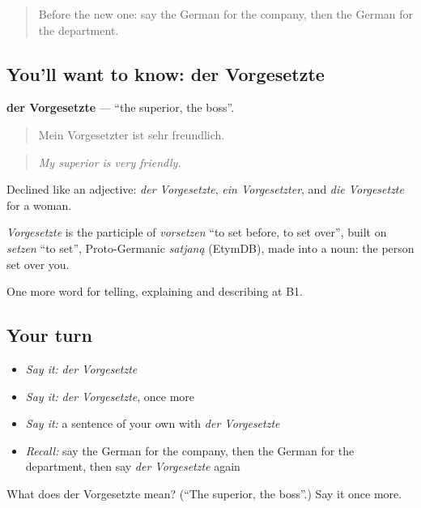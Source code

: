 \begin{quote}
Before the new one: say the German for the company, then the German for the department.
\end{quote}

\subsection*{You'll want to know: der Vorgesetzte}
\textbf{der Vorgesetzte} — \textquotedblleft{}the superior, the boss\textquotedblright{}.

\begin{quote}
Mein Vorgesetzter ist sehr freundlich.
\end{quote}

\begin{quote}
\emph{My superior is very friendly.}
\end{quote}

Declined like an adjective: \emph{der Vorgesetzte}, \emph{ein Vorgesetzter}, and \emph{die Vorgesetzte} for a woman.

\begin{cousinweb}
\emph{Vorgesetzte} is the participle of \emph{vorsetzen} \textquotedblleft{}to set before, to set over\textquotedblright{}, built on \emph{setzen} \textquotedblleft{}to set\textquotedblright{}, Proto-Germanic \emph{satjaną} (EtymDB), made into a noun: the person set over you.
\end{cousinweb}

\begin{grammarlens}[title={What you've built}]
One more word for telling, explaining and describing at B1.
\end{grammarlens}

\subsection*{Your turn}
\begin{itemize}
\raggedright
  \item \emph{Say it:} \emph{der Vorgesetzte}
  \item \emph{Say it:} \emph{der Vorgesetzte}, once more
  \item \emph{Say it:} a sentence of your own with \emph{der Vorgesetzte}
  \item \emph{Recall:} say the German for the company, then the German for the department, then say \emph{der Vorgesetzte} again
\end{itemize}

\begin{tcolorbox}[breakable,colback=teal!4,colframe=teal!35!black,title={Before you move on}]
What does der Vorgesetzte mean? (\textquotedblleft{}The superior, the boss\textquotedblright{}.) Say it once more.
\end{tcolorbox}
